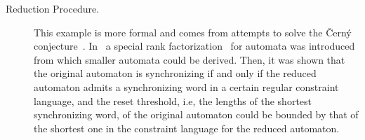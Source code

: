 \begin{description}
\item[Reduction Procedure.] %
 This example is more formal and comes from attempts to solve the \v{C}ern\'y conjecture~\cite{Vol2008}.
 In~\cite{Gusev2012} a special rank factorization~\cite{piziak99}
 for automata was introduced from which
 smaller automata could be derived.
 Then, it was shown that the original automaton
 is synchronizing if and only if the reduced automaton
 admits a synchronizing word in a certain regular constraint language,
 and the reset threshold, i.e, the lengths of the shortest
 synchronizing word, of the original automaton
 could be bounded by that of the shortest one in the constraint
 language for the reduced automaton.
 
\end{description}





%
%
% 